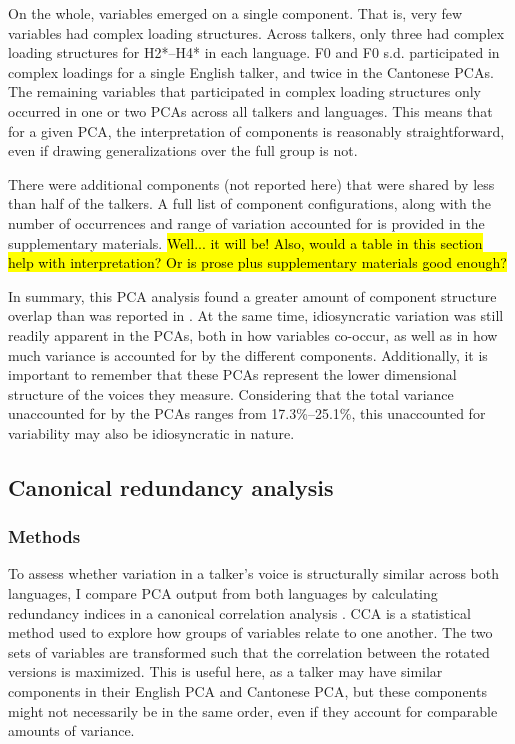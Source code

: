 On the whole, variables emerged on a single component. That is, very few variables had complex loading structures. Across talkers, only three had complex loading structures for H2*--H4* in each language. F0 and F0 s.d. participated in complex loadings for a single English talker, and twice in the Cantonese PCAs. The remaining variables that participated in complex loading structures only occurred in one or two PCAs across all talkers and languages. This means that for a given PCA, the interpretation of components is reasonably straightforward, even if drawing generalizations over the full group is not. 

There were additional components (not reported here) that were shared by less than half of the talkers. A full list of component configurations, along with the number of occurrences and range of variation accounted for is provided in the supplementary materials. \hl{Well... it will be! Also, would a table in this section help with interpretation? Or is prose plus supplementary materials good enough?}

In summary, this PCA analysis found a greater amount of component structure overlap than was reported in \citet{lee_2019_acoustic}. At the same time, idiosyncratic variation was still readily apparent in the PCAs, both in how variables co-occur, as well as in how much variance is accounted for by the different components. Additionally, it is important to remember that these PCAs represent the lower dimensional structure of the voices they measure. Considering that the total variance unaccounted for by the PCAs ranges from 17.3\%--25.1\%, this unaccounted for variability may also be idiosyncratic in nature. 

\subsection{Canonical redundancy analysis}\label{ch3:sec:cca}

\subsubsection{Methods}

To assess whether variation in a talker's voice is structurally similar across both languages, I compare PCA output from both languages by calculating redundancy indices in a canonical correlation analysis \citep[CCA][]{stewart_1968_canonical, jolliffe_2002_pca}. CCA is a statistical method used to explore how groups of variables relate to one another. The two sets of variables are transformed such that the correlation between the rotated versions is maximized. This is useful here, as a talker may have similar components in their English PCA and Cantonese PCA, but these components might not necessarily be in the same order, even if they account for comparable amounts of variance.

